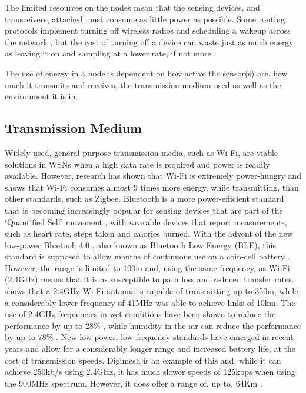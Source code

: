 	The limited resources on the nodes mean that the sensing devices, and transceivers, attached must consume as little power as possible. Some routing protocols implement turning off wireless radios and scheduling a wakeup across the network \cite{Vaidya2004}, but the cost of turning off a device can waste just as much energy as leaving it on and sampling at a lower rate, if not more \cite{Estrin2001}.

	The use of energy in a node is dependent on how active the sensor(s) are, how much it transmits and receives, the transmission medium used as well as the environment it is in.

\subsection{Transmission Medium}\label{bg:trans}
	Widely used, general purpose transmission media, such as Wi-Fi, are viable solutions in WSNs when a high data rate is required and power is readily available. However, research has shown that Wi-Fi is extremely power-hungry and \cite{Lee2007} shows that Wi-Fi consumes almost 9 times more energy, while transmitting, than other standards, such as Zigbee.
	Bluetooth is a more power-efficient standard that is becoming increasingly popular for sensing devices that are part of the `Quantified Self' movement \cite{Swan2012}, with wearable devices that report measurements, such as heart rate, steps taken and calories burned. With the advent of the new low-power Bluetooh 4.0 , also known as Bluetooth Low Energy (BLE), this standard is supposed to allow months of continuous use on a coin-cell battery \cite{gomez2012overview}. However, the range is limited to 100m and, using the same frequency, as Wi-Fi (2.4GHz) means that it is as susceptible to path loss and reduced transfer rates.
	\cite{Zennaro} shows that a 2.4GHz Wi-Fi antenna is capable of transmitting up to 350m, while a considerably lower frequency of 41MHz was able to achieve links of 10km. The use of 2.4GHz frequencies in wet conditions have been shown to reduce the performance by up to 28\% \cite{Markham2010}, while humidity in the air can reduce the performance by up to 78\% \cite{Figueiredo2009}.
	New low-power, low-frequency standards have emerged in recent years and allow for a considerably longer range and increased battery life, at the cost of transmission speeds. Digimesh is an example of this and, while it can achieve 250kb/s using 2.4GHz, it has much slower speeds of 125kbps when using the 900MHz spectrum. However, it does offer a range of, up to, 64Km \cite{Bayat2012}.

